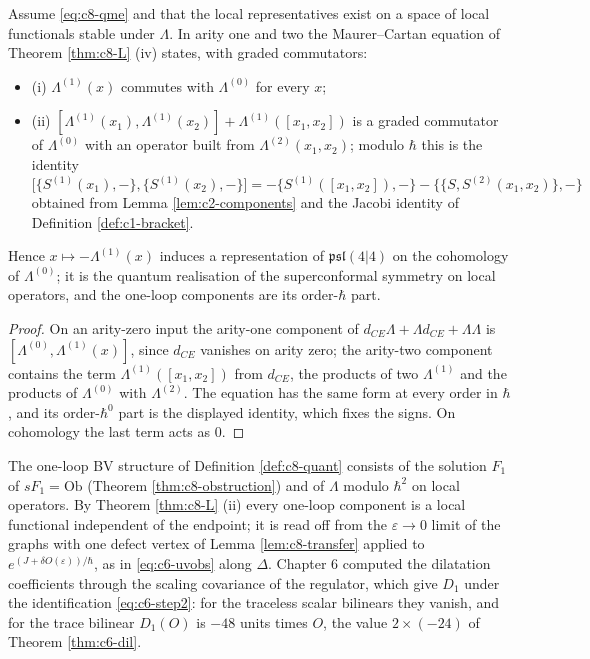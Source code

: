 \begin{corollary}
\label{cor:c8-homotopy}
Assume \eqref{eq:c8-qme} and that the local representatives exist on a space of local functionals stable under $\Lambda$. In arity one and two the Maurer--Cartan equation of Theorem \ref{thm:c8-L} (iv) states, with graded commutators:
\begin{itemize}
\item (i) $\Lambda^{(1)}(x)$ commutes with $\Lambda^{(0)}$ for every $x$;
\item (ii) $[\Lambda^{(1)}(x_1),\Lambda^{(1)}(x_2)]+\Lambda^{(1)}([x_1,x_2])$ is a graded commutator of $\Lambda^{(0)}$ with an operator built from $\Lambda^{(2)}(x_1,x_2)$; modulo $\hbar$ this is the identity
\[
\big[\{S^{(1)}(x_1),-\},\{S^{(1)}(x_2),-\}\big]=-\{S^{(1)}([x_1,x_2]),-\}-\big\{\{S,S^{(2)}(x_1,x_2)\},-\big\}
\]
obtained from Lemma \ref{lem:c2-components} and the Jacobi identity of Definition \ref{def:c1-bracket}.
\end{itemize}
Hence $x\mapsto-\Lambda^{(1)}(x)$ induces a representation of $\mathfrak{psl}(4|4)$ on the cohomology of $\Lambda^{(0)}$; it is the quantum realisation of the superconformal symmetry on local operators, and the one-loop components are its order-$\hbar$ part.
\end{corollary}

\begin{proof}
On an arity-zero input the arity-one component of $d_{CE}\Lambda+\Lambda d_{CE}+\Lambda\Lambda$ is $[\Lambda^{(0)},\Lambda^{(1)}(x)]$, since $d_{CE}$ vanishes on arity zero; the arity-two component contains the term $\Lambda^{(1)}([x_1,x_2])$ from $d_{CE}$, the products of two $\Lambda^{(1)}$ and the products of $\Lambda^{(0)}$ with $\Lambda^{(2)}$. The equation has the same form at every order in $\hbar$, and its order-$\hbar^0$ part is the displayed identity, which fixes the signs. On cohomology the last term acts as $0$.
\end{proof}

\begin{remark}
The one-loop BV structure of Definition \ref{def:c8-quant} consists of the solution $F_1$ of $sF_1=\mathrm{Ob}$ (Theorem \ref{thm:c8-obstruction}) and of $\Lambda$ modulo $\hbar^2$ on local operators. By Theorem \ref{thm:c8-L} (ii) every one-loop component is a local functional independent of the endpoint; it is read off from the $\varepsilon\to0$ limit of the graphs with one defect vertex of Lemma \ref{lem:c8-transfer} applied to $e^{(J+\delta O(\varepsilon))/\hbar}$, as in \eqref{eq:c6-uvobs} along $\Delta$. Chapter 6 computed the dilatation coefficients through the scaling covariance of the regulator, which give $D_1$ under the identification \eqref{eq:c6-step2}: for the traceless scalar bilinears they vanish, and for the trace bilinear $D_1(O)$ is $-48$ units times $O$, the value $2\times(-24)$ of Theorem \ref{thm:c6-dil}.
\end{remark}

